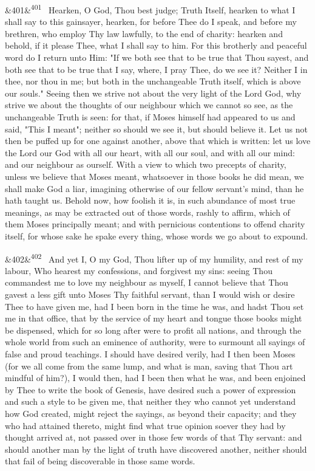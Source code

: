 \documentclass[12pt]{article}
\newcommand{\para}[1][]{\par\noindent\ifx&#1&\else\textsuperscript{\footnotesize #1}~\fi}
\begin{document}
\para[401] Hearken, O God, Thou best judge; Truth Itself, hearken to what I shall say to this gainsayer, hearken, for before Thee do I speak, and before my brethren, who employ Thy law lawfully, to the end of charity: hearken and behold, if it please Thee, what I shall say to him. For this brotherly and peaceful word do I return unto Him: "If we both see that to be true that Thou sayest, and both see that to be true that I say, where, I pray Thee, do we see it? Neither I in thee, nor thou in me; but both in the unchangeable Truth itself, which is above our souls." Seeing then we strive not about the very light of the Lord God, why strive we about the thoughts of our neighbour which we cannot so see, as the unchangeable Truth is seen: for that, if Moses himself had appeared to us and said, "This I meant"; neither so should we see it, but should believe it. Let us not then be puffed up for one against another, above that which is written: let us love the Lord our God with all our heart, with all our soul, and with all our mind: and our neighbour as ourself. With a view to which two precepts of charity, unless we believe that Moses meant, whatsoever in those books he did mean, we shall make God a liar, imagining otherwise of our fellow servant's mind, than he hath taught us. Behold now, how foolish it is, in such abundance of most true meanings, as may be extracted out of those words, rashly to affirm, which of them Moses principally meant; and with pernicious contentions to offend charity itself, for whose sake he spake every thing, whose words we go about to expound.

\para[402] And yet I, O my God, Thou lifter up of my humility, and rest of my labour, Who hearest my confessions, and forgivest my sins: seeing Thou commandest me to love my neighbour as myself, I cannot believe that Thou gavest a less gift unto Moses Thy faithful servant, than I would wish or desire Thee to have given me, had I been born in the time he was, and hadst Thou set me in that office, that by the service of my heart and tongue those books might be dispensed, which for so long after were to profit all nations, and through the whole world from such an eminence of authority, were to surmount all sayings of false and proud teachings. I should have desired verily, had I then been Moses (for we all come from the same lump, and what is man, saving that Thou art mindful of him?), I would then, had I been then what he was, and been enjoined by Thee to write the book of Genesis, have desired such a power of expression and such a style to be given me, that neither they who cannot yet understand how God created, might reject the sayings, as beyond their capacity; and they who had attained thereto, might find what true opinion soever they had by thought arrived at, not passed over in those few words of that Thy servant: and should another man by the light of truth have discovered another, neither should that fail of being discoverable in those same words.
\end{document}
